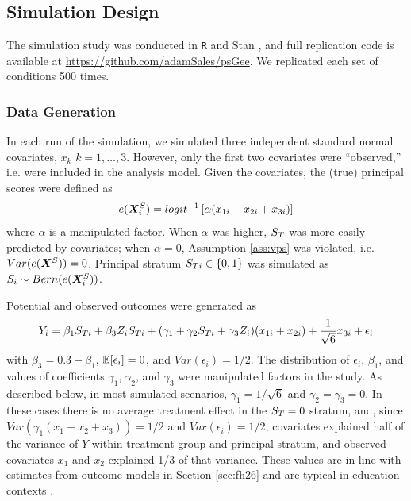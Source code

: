\documentclass[]{article}
\begin{document}
\subsection{Simulation Design}
The simulation study was conducted in \texttt{R} \citep{rcite} and Stan \citep{rstan}, and full replication code is available at %
\url{https://github.com/adamSales/psGee}.
We replicated each set of conditions 500 times.

\subsubsection{Data Generation}

In each run of the simulation, we simulated three independent standard normal covariates, $x_k$ $k=1,\dots,3$. However, only the first two covariates were ``observed,'' i.e. were included in the analysis model.
Given the covariates, the (true) principal scores were defined as
\begin{equation*}
  e(\bm{X}^S_i)=logit^{-1}\left[\alpha(x_{1i}-x_{2i}+x_{3i})\right]
\end{equation*}
where $\alpha$ is a manipulated factor.
When $\alpha$ was higher, $S_T$ was more easily predicted by covariates; when $\alpha=0$, Assumption \ref{ass:vps} was violated, i.e. $Var(e(\bm{X}^S))=0$.
Principal stratum $S_{Ti}\in \{0,1\}$ was simulated as $S_i\sim Bern(e(\bm{X}^S_i))$.

Potential and observed outcomes were generated as
\begin{equation}\label{eq:y-sim}
Y_i=\beta_1\sti+\beta_3Z_i\sti+(\gamma_1+\gamma_2\sti+\gamma_3Z_i)(x_{1i}+x_{2i})+\frac{1}{\sqrt{6}}x_{3i}+\epsilon_i%
\end{equation}
with $\beta_3=0.3-\beta_1$, $\mathbb{E}[\epsilon_i]=0$, and $Var(\epsilon_i)=1/2$.
The distribution of $\epsilon_i$, $\beta_1$, and values of coefficients $\gamma_1$, $\gamma_2$, and $\gamma_3$ were manipulated factors in the study.
As described below, in most simulated scenarios, $\gamma_1=1/\sqrt{6}$ and $\gamma_2=\gamma_3=0$. In these cases there is no average treatment effect in the $S_T=0$ stratum, and, since  $Var(\gamma_1(x_1+x_2+x_3))=1/2$ and $Var(\epsilon_i)=1/2$, covariates explained half of the variance of $Y$ within treatment group and principal stratum, and observed covariates $x_1$ and $x_2$ explained 1/3 of that variance.
These values are in line with estimates from outcome models in Section \ref{sec:fh26} and are typical in education contexts \cite{hedgesHedberg}.
\end{document}

